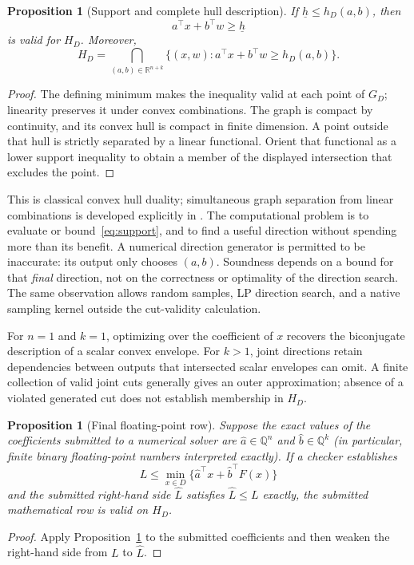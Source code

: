 \documentclass[11pt]{article}
\newtheorem{proposition}[theorem]{Proposition}
\theoremstyle{definition}
\theoremstyle{remark}
\newcommand{\R}{\mathbb R}
\newcommand{\Q}{\mathbb Q}
\begin{document}
\begin{proposition}[Support and complete hull description]\label{prop:support}
If $\underline h\le h_D(a,b)$, then
\begin{equation}\label{eq:cut}
a^\top x+b^\top w\ge\underline h
\end{equation}
is valid for $H_D$. Moreover,
\[
H_D=\bigcap_{(a,b)\in\R^{n+k}}
\{(x,w):a^\top x+b^\top w\ge h_D(a,b)\}.
\]
\end{proposition}
\begin{proof}
The defining minimum makes the inequality valid at each point of $G_D$;
linearity preserves it under convex combinations. The graph is compact
by continuity, and its convex hull is compact in finite dimension. A point
outside that hull is strictly separated by a linear functional. Orient
that functional as a lower support inequality to obtain a member of the
displayed intersection that excludes the point.
\end{proof}

This is classical convex hull duality; simultaneous graph separation
from linear combinations is developed explicitly in
\cite{LiersEtAl2021,Tawarmalani2010}. The computational problem is to
evaluate or bound~\eqref{eq:support}, and to find a useful direction
without spending more than its benefit. A numerical direction generator
is permitted to be inaccurate: its output only chooses $(a,b)$.
Soundness depends on a bound for that \emph{final} direction, not on the
correctness or optimality of the direction search. The same observation
allows random samples, LP direction search, and a native sampling kernel
outside the cut-validity calculation.

For $n=1$ and $k=1$, optimizing over the coefficient of $x$ recovers the
biconjugate description of a scalar convex envelope. For $k>1$, joint
directions retain dependencies between outputs that intersected scalar
envelopes can omit. A finite collection of valid joint cuts generally
gives an outer approximation; absence of a violated generated cut does
not establish membership in $H_D$.

\begin{proposition}[Final floating-point row]\label{prop:round}
Suppose the exact values of the coefficients submitted to a numerical
solver are $\widehat a\in\Q^n$ and $\widehat b\in\Q^k$ (in particular,
finite binary floating-point numbers interpreted exactly). If a checker
establishes
\[
L\le\min_{x\in D}
\{\widehat a^\top x+\widehat b^\top F(x)\}
\]
and the submitted right-hand side $\widehat L$ satisfies
$\widehat L\le L$ exactly, the submitted mathematical row is valid on
$H_D$.
\end{proposition}
\begin{proof}
Apply Proposition~\ref{prop:support} to the submitted coefficients and
then weaken the right-hand side from $L$ to $\widehat L$.
\end{proof}
\end{document}
